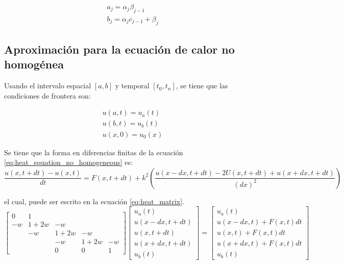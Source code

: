 \begin{align}
    a_j = \alpha_j \beta_{j-1}  \label{eq:a_j} \\
    b_j = \alpha_j c_{j-1} + \beta_j \label{eq:b_j}
\end{align}

\subsection{Aproximación para la ecuación de calor no homogénea}

Usando el intervalo espacial $[a,b]$ y temporal $[t_0,t_n]$, se tiene que las condiciones de frontera son:

\begin{align}
    u(a,t) = u_a(t)  \nonumber \\
    u(b,t) = u_b(t)            \\
    u(x,0) = u_0(x) \nonumber
\end{align}

Se tiene que la forma en diferencias finitas de la ecuación \ref{eq:heat_equation_no_homogeneous} es:
\small
\begin{equation}
    \frac{u(x,t+dt) -u(x,t)}{dt} = F(x,t+dt) + k^2 \left (\frac{u(x-dx,t+dt)-2U(x,t+dt)+u(x+dx,t+dt)}{(dx)^2} \right )
\end{equation}
\normalsize

el cual, puede ser escrito en la ecuación \ref{eq:heat_matrix}.
\small
\begin{equation}
    \begin{bmatrix}
        0  & 1    &                  \\
        -w & 1+2w & -w               \\
           & -w   & 1+2w & -w        \\
           &      & -w   & 1+2w & -w \\
           &      & 0    & 0    & 1
    \end{bmatrix}
    \begin{bmatrix}
        u_a(t)       \\
        u(x-dx,t+dt) \\
        u(x,t+dt)    \\
        u(x+dx,t+dt) \\
        u_b(t)
    \end{bmatrix} = \begin{bmatrix}
        u_a(t)             \\
        u(x-dx,t)+F(x,t)dt \\
        u(x,t)+F(x,t)dt    \\
        u(x+dx,t)+F(x,t)dt \\
        u_b(t)
    \end{bmatrix} \label{eq:heat_matrix}
\end{equation}
\normalsize

